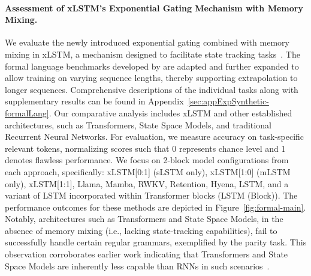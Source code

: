 \paragraph{Assessment of xLSTM's Exponential Gating Mechanism with Memory Mixing.} We evaluate the newly introduced exponential gating combined with memory mixing in xLSTM, a mechanism designed to facilitate state tracking tasks~\citep{Merrill:24, Merrill:23}. The formal language benchmarks developed by \citet{Deletang:23} are adapted and further expanded to allow training on varying sequence lengths, thereby supporting extrapolation to longer sequences. Comprehensive descriptions of the individual tasks along with supplementary results can be found in Appendix~\ref{sec:appExpSynthetic-formalLang}. Our comparative analysis includes xLSTM and other established architectures, such as Transformers, State Space Models, and traditional Recurrent Neural Networks. For evaluation, we measure accuracy on task-specific relevant tokens, normalizing scores such that 0 represents chance level and 1 denotes flawless performance. We focus on 2-block model configurations from each approach, specifically: xLSTM[0:1] (sLSTM only), xLSTM[1:0] (mLSTM only), xLSTM[1:1], Llama, Mamba, RWKV, Retention, Hyena, LSTM, and a variant of LSTM incorporated within Transformer blocks (LSTM (Block)). The performance outcomes for these methods are depicted in Figure~\ref{fig:formal-main}. Notably, architectures such as Transformers and State Space Models, in the absence of memory mixing (i.e., lacking state-tracking capabilities), fail to successfully handle certain regular grammars, exemplified by the parity task. This observation corroborates earlier work indicating that Transformers and State Space Models are inherently less capable than RNNs in such scenarios~\citep{Merrill:24, Merrill:23, Deletang:23}.


